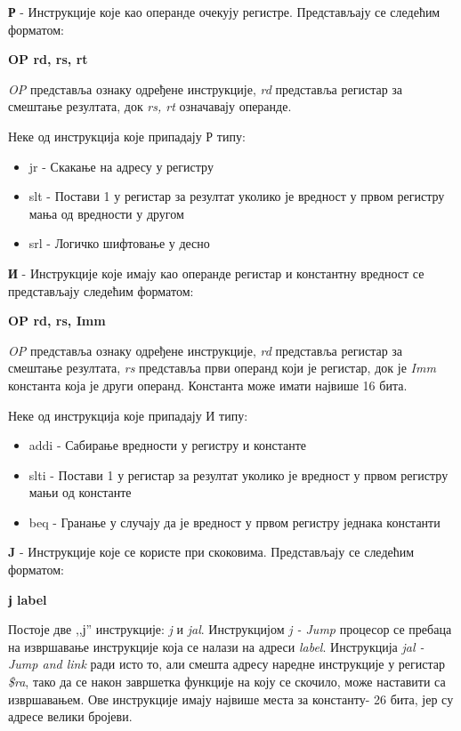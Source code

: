 \documentclass[12pt,oneside]{memoir}
\begin{document}
\textbf{Р} - Инструкције које као операнде очекују регистре.
Представљају се следећим форматом:
\begin{listing}
\centering
\textbf{OP rd, rs, rt}
\end{listing}

\textit{OP} представља ознаку одређене инструкције, \textit{rd} представља регистар за смештање резултата, док \textit{rs, rt} означавају операнде.

Неке од инструкција које припадају Р типу:

\begin{itemize}
\item jr - Скакање на адресу у регистру
\item slt - Постави 1 у регистар за резултат уколико је вредност у првом регистру мања од вредности у другом
\item srl - Логичко шифтовање у десно
\end{itemize}

\textbf{И} - Инструкције које имају као операнде регистар и константну вредност се представљају следећим форматом:
\begin{listing}
\centering
\textbf{OP rd, rs, Imm}
\end{listing}

\textit{OP} представља ознаку одређене инструкције, \textit{rd} представља регистар за смештање резултата, \textit{rs} представља први операнд који је регистар, док је \textit{Imm} константа која је други операнд. Константа може имати највише 16 бита.

Неке од инструкција које припадају И типу:

\begin{itemize}
\item addi - Сабирање вредности у регистру и константе
\item slti - Постави 1 у регистар за резултат уколико је вредност у првом регистру мањи од константе
\item beq - Гранање у случају да је вредност у првом регистру једнака константи
\end{itemize}

\textbf{J} - Инструкције које се користе при скоковима.
Представљају се следећим форматом:
\begin{listing}
\centering
\textbf{ј label}
\end{listing}

Постоје две ,,ј'' инструкције: \textit{j} и \textit{jal}. Инструкцијом \textit{j - Jump }процесор се пребаца на извршавање инструкције која се налази на адреси \textit{label}. Инструкција \textit{jal - Jump and link} ради исто то, али смешта адресу наредне инструкције у регистар \textit{\$ra}, тако да се након завршетка функције на коју се скочило, може наставити са извршавањем. Ове инструкције имају највише места за константу- 26 бита, јер су адресе велики бројеви.
\end{document}
